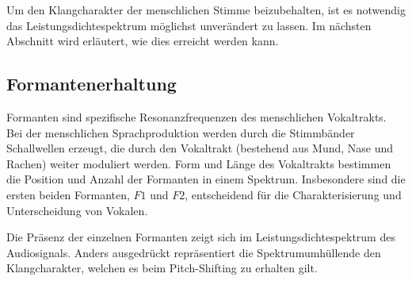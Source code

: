 Um den Klangcharakter der menschlichen Stimme beizubehalten,
ist es notwendig das Leistungsdichtespektrum möglichst unverändert zu lassen.
Im nächsten Abschnitt wird erläutert, wie dies erreicht werden kann.


\subsection{Formantenerhaltung
\label{autotune:subsection:formantenErhaltung}}
Formanten sind spezifische Resonanzfrequenzen des menschlichen Vokaltrakts.
Bei der menschlichen Sprachproduktion werden durch die Stimmbänder Schallwellen erzeugt,
die durch den Vokaltrakt (bestehend aus Mund, Nase und Rachen) weiter moduliert werden.
Form und Länge des Vokaltrakts bestimmen die Position und Anzahl der Formanten in einem Spektrum. 
Insbesondere sind die ersten beiden Formanten, $F1$ und $F2$,
entscheidend für die Charakterisierung und Unterscheidung von Vokalen.

Die Präsenz der einzelnen Formanten zeigt sich im Leistungsdichtespektrum des Audiosignals.
Anders ausgedrückt repräsentiert die Spektrumumhüllende den Klangcharakter, welchen es beim Pitch-Shifting zu erhalten gilt.

